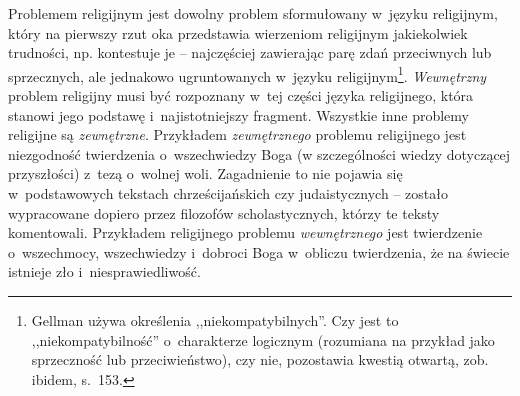 Problemem religijnym jest dowolny problem sformułowany w~języku religijnym, który na pierwszy rzut oka przedstawia wierzeniom religijnym jakiekolwiek trudności, np. kontestuje je -- najczęściej zawierając parę zdań przeciwnych lub sprzecznych, ale jednakowo ugruntowanych w~języku religijnym\footnote{Gellman używa określenia ,,niekompatybilnych''. Czy jest to ,,niekompatybilność'' o~charakterze logicznym (rozumiana na przykład jako sprzeczność lub przeciwieństwo), czy nie, pozostawia kwestią otwartą, zob. ibidem, s.~153.}. \textit{Wewnętrzny} problem religijny musi być rozpoznany w~tej części języka religijnego, która stanowi jego podstawę i~najistotniejszy fragment. Wszystkie inne problemy religijne są \textit{zewnętrzne}. Przykładem \textit{zewnętrznego} problemu religijnego jest niezgodność twierdzenia o~wszechwiedzy Boga (w szczególności wiedzy dotyczącej przyszłości) z~tezą o~wolnej woli. Zagadnienie to nie pojawia się w~podstawowych tekstach chrześcijańskich czy judaistycznych -- zostało wypracowane dopiero przez filozofów scholastycznych, którzy te teksty komentowali. Przykładem religijnego problemu \textit{wewnętrznego} jest twierdzenie o~wszechmocy, wszechwiedzy i~dobroci Boga w~obliczu twierdzenia, że na świecie istnieje zło i~niesprawiedliwość.

